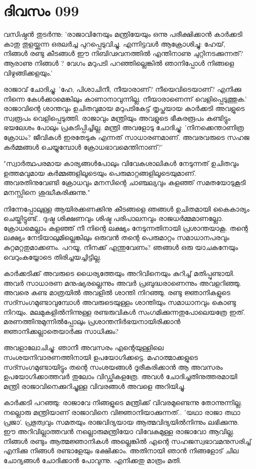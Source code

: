 \newpage
\section{ദിവസം 099}



വസിഷ്ഠന്‍ തുടര്‍ന്നു: 'രാജാവിനേയും മന്ത്രിയേയും ഒന്നു പരീക്ഷിക്കാന്‍ കാര്‍ക്കടി കാതു തുളയ്ക്കുന്ന ഒരലര്‍ച്ച പുറപ്പെടുവിച്ചു. എന്നിട്ടവള്‍ ആക്രോശിച്ചു: ഹേയ്‌, നിങ്ങള്‍ രണ്ടു കീടങ്ങള്‍ ഈ നിബിഢവനത്തില്‍ എന്തിനാണു ചുറ്റിനടക്കുന്നത്‌? ആരാണു നിങ്ങള്‍ ? വേഗം മറുപടി പറഞ്ഞില്ലെങ്കില്‍ ഞാനിപ്പോള്‍ നിങ്ങളെ വിഴുങ്ങിക്കളയും.'

രാജാവ്‌ ചോദിച്ചു: 'ഹേ, പിശാചിനീ, നീയാരാണ്‌? നീയെവിടെയാണ്‌? എനിക്കു നിന്നെ കേള്‍ക്കാമെങ്കിലും കാണാനാവുന്നില്ല. നീയാരാണെന്ന് വെളിപ്പെടുത്തുക.' രാജാവിന്റെ ശാന്തവും ഉചിതവുമായ മറുപടികേട്ട്‌ തൃപ്തയായ കാര്‍ക്കടി അവളുടെ സ്വരൂപം വെളിപ്പെടുത്തി. രാജാവും മന്ത്രിയും അവളുടെ ഭീകരരൂപം കണ്ടിട്ടും ഭയലേശം പോലും പ്രകടിപ്പിച്ചില്ല. മന്ത്രി അവളോടു ചോദിച്ചു: 'നിനക്കെന്താണിത്ര ക്രോധം? ജീവികള്‍ ഇരതേടുക എന്നത്‌ സാധാരണമാണ്‌. അവരവരുടെ സഹജ കര്‍മ്മങ്ങള്‍ ചെയ്യുമ്പോള്‍ ക്രോധഭാവമെന്തിനാണ്‌?'

"സ്വാര്‍ത്ഥപരമായ കാര്യങ്ങള്‍പോലും വിവേകശാലികള്‍ നേടുന്നത്‌ ഉചിതവും ഉത്തമവുമായ കര്‍മ്മങ്ങളിലൂടെയും പെരുമാറ്റങ്ങളിലൂടെയുമാണ്‌. അവരതിനുവേണ്ടി ക്രോധവും മനസിന്റെ ചാഞ്ചല്യവും കളഞ്ഞ്‌ സമതയോടുകൂടി മനസ്സിനെ ശുദ്ധീകരിക്കുന്നു." 

നിന്നേപ്പോലുള്ള ആയിരക്കണക്കിനു കീടങ്ങളെ ഞങ്ങള്‍ ഉചിതമായി കൈകാര്യം ചെയ്തിട്ടുണ്ട്‌.. ദുഷ്ട ശിക്ഷണവും ശിഷ്ട പരിപാലനവും രാജധര്‍മ്മമാണല്ലോ. ക്രോധമെല്ലാം കളഞ്ഞ്‌ നീ നിന്റെ ലക്ഷ്യം നേടുന്നതിനായി പ്രശാന്തയാകൂ. തന്റെ ലക്ഷ്യം നേടിയാലുമില്ലെങ്കിലും ഒരുവന്‍ തന്റെ പെരുമാറ്റം സമാധാനപരവും കുറ്റമറ്റതുമാക്കണം. പറയൂ, നിനക്ക്‌ എന്തുവേണം? ഞങ്ങള്‍ ഒരു യാചകനേയും വെറുംകയ്യോടെ തിരിച്ചയച്ചിട്ടില്ല.

കാര്‍ക്കടിക്ക്‌ അവരുടെ ധൈര്യത്തേയും അറിവിനെയും കുറിച്ച്‌ മതിപ്പുണ്ടായി. അവര്‍ സാധാരണ മനുഷ്യരല്ലെന്നും അവര്‍ പ്രബുദ്ധരാണെന്നും അവളറിഞ്ഞു. അവരെ കണ്ട മാത്രയില്‍ അവളില്‍ ശാന്തി നിറഞ്ഞു. രണ്ടു ജ്ഞാനികളുടെ സദ്സംഗമുണ്ടാവുമ്പോള്‍ അവരുടെയുള്ളം ശാന്തിയും സമാധാനവും കൊണ്ടു നിറയും. മലമുകളില്‍നിന്നുള്ള രണ്ടരുവികള്‍ സംഗമിക്കുന്നതുപോലെയത്രേ ഇത്‌. മരണത്തിനുമുന്നില്‍പ്പോലും പ്രശാന്തനിര്‍ഭയനായിരിക്കാന്‍ ജ്ഞാനിക്കല്ലാതെയാര്‍ക്കു സാധിക്കും?

അവളാലോചിച്ചു: ഞാനീ അവസരം എന്റെയുള്ളിലെ സംശയനിവാരണത്തിനായി ഉപയോഗിക്കട്ടെ. മഹാത്മാക്കളുടെ സദ്സംഗമുണ്ടായിട്ടും തന്റെ സംശയങ്ങള്‍ ദൂരീകരിക്കാന്‍ ആ അവസരം ഉപയോഗിക്കാത്തവര്‍ തുലോം വിഡ്ഢികളത്രേ. അവള്‍ ചോദിച്ചതിനുത്തരമായി മന്ത്രി രാജാവിനെക്കുറിച്ചുള്ള വിവരങ്ങള്‍ അവളെ അറിയിച്ചു. 

കാര്‍ക്കടി പറഞ്ഞു: രാജാവേ നിങ്ങളുടെ മന്ത്രിക്ക്‌ വിവരമുണ്ടെന്നു തോന്നുന്നില്ല. നല്ലൊരു മന്ത്രിയാണ്‌ രാജാവിനെ വിജ്ഞാനിയാക്കുന്നത്‌.. 'യഥാ രാജാ തഥാ പ്രജാ'. പ്രഭുത്വവും സമതയും രാജവിദ്യയായ ആത്മവിദ്യയില്‍നിന്നും ലഭിക്കുന്നു. ഈ അറിവില്ലാത്തവന്‍ നല്ലൊരുമന്ത്രിയോ വിവേകമുള്ള രാജാവോ ആവില്ല. നിങ്ങള്‍ രണ്ടും ആത്മജ്ഞാനികള്‍ അല്ലെങ്കില്‍ എന്റെ സഹജസ്വഭാവമനുസരിച്ച്‌ എനിക്കു നിങ്ങള്‍ രണ്ടാളേയും ഭക്ഷിക്കാം. അതിനായി ഞാന്‍ നിങ്ങളോട്‌ ചില ചോദ്യങ്ങള്‍ ചോദിക്കാന്‍ പോവുന്നു. എനിക്കതു മാത്രം മതി. 
